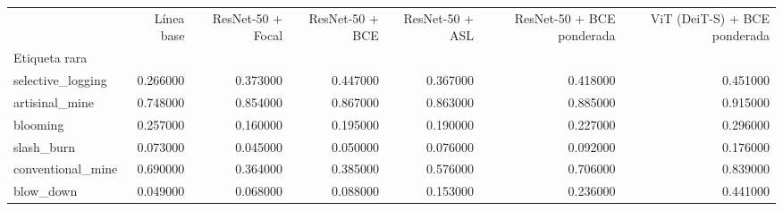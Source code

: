 \begin{tabular}{lrrrrrr}
\toprule
 & Línea base & ResNet-50 + Focal & ResNet-50 + BCE & ResNet-50 + ASL & ResNet-50 + BCE ponderada & ViT (DeiT-S) + BCE ponderada \\
Etiqueta rara &  &  &  &  &  &  \\
\midrule
selective_logging & 0.266000 & 0.373000 & 0.447000 & 0.367000 & 0.418000 & 0.451000 \\
artisinal_mine & 0.748000 & 0.854000 & 0.867000 & 0.863000 & 0.885000 & 0.915000 \\
blooming & 0.257000 & 0.160000 & 0.195000 & 0.190000 & 0.227000 & 0.296000 \\
slash_burn & 0.073000 & 0.045000 & 0.050000 & 0.076000 & 0.092000 & 0.176000 \\
conventional_mine & 0.690000 & 0.364000 & 0.385000 & 0.576000 & 0.706000 & 0.839000 \\
blow_down & 0.049000 & 0.068000 & 0.088000 & 0.153000 & 0.236000 & 0.441000 \\
\bottomrule
\end{tabular}
